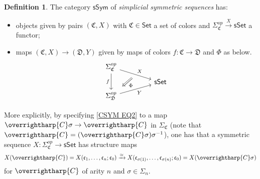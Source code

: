 \documentclass[a4paper,10pt
,draft
]{article}%
\numberwithin{equation}{section}
\numberwithin{figure}{section}
\theoremstyle{definition} %
\newtheorem{definition}[equation]{Definition}%
\newcommand{\vect}[1]{\text{\overrightharp{\ensuremath{#1}}}}
\newcommand{\sSet}{\ensuremath{\mathsf{sSet}}}%
\newcommand{\1}{\ensuremath{\mathbbm 1}}%
\begin{document}
\begin{definition}\label{SSYM DEF}
	The category $\mathsf{sSym}$ of \textit{simplicial symmetric sequences} has:
\begin{itemize}
	\item objects given by pairs
	$(\mathfrak C, X)$ with $\mathfrak{C} \in \mathsf{Set}$
	a set of colors and
	$\Sigma_{\mathfrak C}^{op} \xrightarrow{X}\sSet$
	a functor; 
	\item maps
	$(\mathfrak{C},X) \to (\mathfrak{D},Y)$
	given by maps of colors
	$f \colon \mathfrak{C} \to \mathfrak{D}$
	and $\Phi$ as below.
\begin{equation}
\begin{tikzcd}[row sep = tiny, column sep = 45pt]
	\Sigma_{\mathfrak{C}}^{op} \arrow[dr, "X"{name=U}] 
	\arrow{dd}[swap]{f}
\\
	& \mathsf{sSet}
\\
	|[alias=V]| \Sigma_{\mathfrak{D}}^{op} \arrow[ur, "Y"']
\arrow[Leftarrow, from=V, to=U,shorten >=0.25cm,shorten <=0.25cm, swap,"\Phi"]
\end{tikzcd}
\end{equation}
\end{itemize} 
\end{definition}

More explicitly,
by specifying \eqref{CSYM EQ2} to a map
$\vect{C} \sigma \to \vect{C}$ in $\Sigma_{\mathfrak{C}}$
(note that $\vect{C} = (\vect{C}\sigma)\sigma^{-1}$),
one has that a symmetric sequence
$X \colon \Sigma_{\mathfrak{C}}^{op} \to \mathsf{sSet}$
has structure maps
\begin{equation}\label{SSYMSTMAP EQ}
	X(\vect{C}) = 
	X(\mathfrak c_1, \dots, \mathfrak c_n; \mathfrak c_0) \xrightarrow{\simeq} 
	X(\mathfrak c_{\sigma(1)}, \dots, \mathfrak c_{\sigma(n)}; \mathfrak c_0) =	
	X(\vect{C}\sigma)
\end{equation}
for $\vect{C}$ of arity $n$ and $\sigma \in \Sigma_n$.
\end{document}
